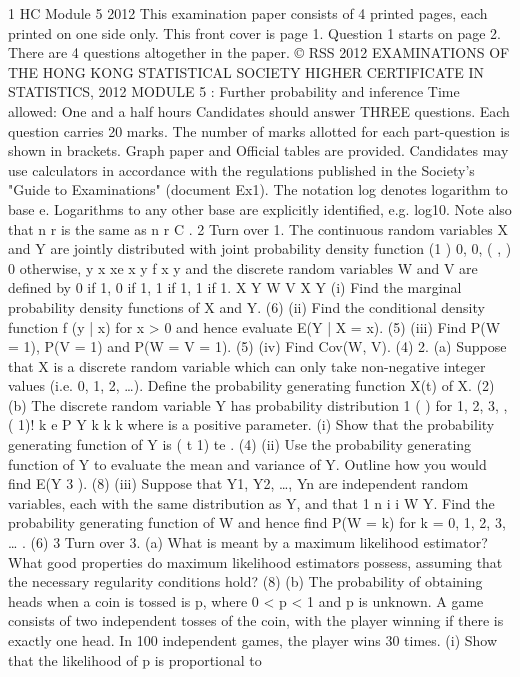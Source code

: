 1 HC Module 5 2012
This examination paper consists of 4 printed pages, each printed on one side only.
This front cover is page 1.
Question 1 starts on page 2.
There are 4 questions altogether in the paper.
© RSS 2012
EXAMINATIONS OF THE HONG KONG STATISTICAL SOCIETY
HIGHER CERTIFICATE IN STATISTICS, 2012
MODULE 5 : Further probability and inference
Time allowed: One and a half hours
Candidates should answer THREE questions.
Each question carries 20 marks.
The number of marks allotted for each part-question is shown in brackets.
Graph paper and Official tables are provided.
Candidates may use calculators in accordance with the regulations published in
the Society's "Guide to Examinations" (document Ex1).
The notation log denotes logarithm to base e.
Logarithms to any other base are explicitly identified, e.g. log10.
Note also that
n
r
is the same as n
r C .
2
Turn over
1. The continuous random variables X and Y are jointly distributed with joint probability
density function
(1 ) 0, 0,
( , )
0 otherwise,
y x xe x y
f x y
and the discrete random variables W and V are defined by
0 if 1, 0 if 1,
1 if 1, 1 if 1.
X Y
W V
X Y
(i) Find the marginal probability density functions of X and Y.
(6)
(ii) Find the conditional density function f (y | x) for x > 0 and hence evaluate
E(Y | X = x).
(5)
(iii) Find P(W = 1), P(V = 1) and P(W = V = 1).
(5)
(iv) Find Cov(W, V).
(4)
2. (a) Suppose that X is a discrete random variable which can only take non-negative
integer values (i.e. 0, 1, 2, …). Define the probability generating function X(t)
of X.
(2)
(b) The discrete random variable Y has probability distribution
1
( ) for 1, 2, 3, ,
( 1)!
k e
P Y k k
k
where is a positive parameter.
(i) Show that the probability generating function of Y is ( t 1) te .
(4)
(ii) Use the probability generating function of Y to evaluate the mean and
variance of Y. Outline how you would find E(Y
3
).
(8)
(iii) Suppose that Y1, Y2, …, Yn are independent random variables, each with
the same distribution as Y, and that
1
n
i
i
W Y. Find the probability
generating function of W and hence find P(W = k) for k = 0, 1, 2, 3, … .
(6)
3
Turn over
3. (a) What is meant by a maximum likelihood estimator? What good properties do
maximum likelihood estimators possess, assuming that the necessary regularity
conditions hold?
(8)
(b) The probability of obtaining heads when a coin is tossed is p, where 0 < p < 1
and p is unknown. A game consists of two independent tosses of the coin, with
the player winning if there is exactly one head. In 100 independent games, the
player wins 30 times.
(i) Show that the likelihood of p is proportional to

